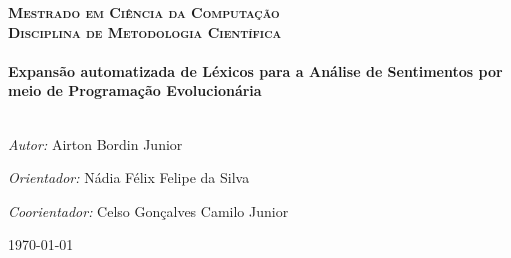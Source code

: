\documentclass[a4paper,11pt]{article}
\begin{document}
\begin{titlepage}
\begin{center}
\begin{figure}
\begin{minipage}{.5\textwidth}
\end{minipage}
\end{figure}



\textsc{\large \textbf{Mestrado em Ciência da Computação}}\\[0.5cm]
\textsc{\large \textbf{Disciplina de Metodologia Científica}}\\[1.5cm] %


\HRule \\[0.4cm]
{ \huge \bfseries Expansão automatizada de Léxicos para a Análise de Sentimentos por meio de Programação Evolucionária}\\[0.4cm] %
\HRule \\[1.5cm]


\begin{framed}
\emph{Autor:} Airton Bordin Junior
\par
\emph{Orientador:} Nádia Félix Felipe da Silva
\par
\emph{Coorientador:} Celso Gonçalves Camilo Junior
\end{framed}

\vspace*{3cm}


{\large \today}\\ %

\end{center}


\vfill %

\end{titlepage}
\end{document}
